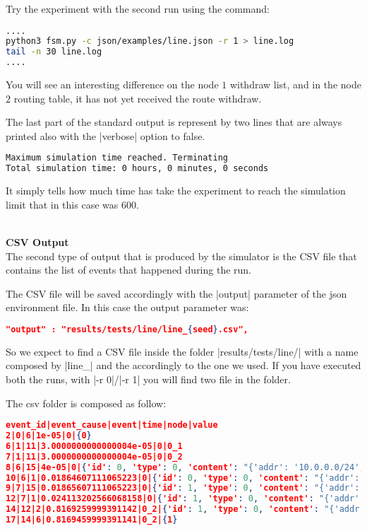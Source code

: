 \documentclass[10pt,journal,onecolumn]{IEEEtran}
\begin{document}
Try the experiment with the second run using the command:

\begin{lstlisting}[language=bash]
....
python3 fsm.py -c json/examples/line.json -r 1 > line.log
tail -n 30 line.log
....
\end{lstlisting}

You will see an interesting difference on the node $1$ withdraw list, and in the
node $2$ routing table, it has not yet received the route withdraw.

The last part of the standard output is represent by two lines that are always
printed also with the |verbose| option to false.

\begin{lstlisting}[language=bash]
Maximum simulation time reached. Terminating
Total simulation time: 0 hours, 0 minutes, 0 seconds
\end{lstlisting}

It simply tells how much time has take the experiment to reach the simulation limit
that in this case was \num{600}.

\\
\textbf{CSV Output}
\\

The second type of output that is produced by the simulator is the CSV file
that contains the list of events that happened during the run.

The CSV file will be saved accordingly with the |output| parameter of the
json environment file.
In this case the output parameter was:

\begin{lstlisting}[language=json]
"output" : "results/tests/line/line_{seed}.csv",
\end{lstlisting}

So we expect to find a CSV file inside the folder |results/tests/line/| with
a name composed by |line_| and the accordingly to the one we used.
If you have executed both the runs, with |-r 0|/|-r 1| you will find two file
in the folder.

The csv folder is composed as follow:
\begin{lstlisting}[language=json]
event_id|event_cause|event|time|node|value
2|0|6|1e-05|0|{0}
6|1|11|3.0000000000000004e-05|0|0_1
7|1|11|3.0000000000000004e-05|0|0_2
8|6|15|4e-05|0|{'id': 0, 'type': 0, 'content': "{'addr': '10.0.0.0/24', 'nh': '0', 'path': ['0'], 'policy_value': '0'}"}
10|6|1|0.01864607111065223|0|{'id': 0, 'type': 0, 'content': "{'addr': '10.0.0.0/24', 'nh': '0', 'path': ['0'], 'policy_value': '0'}"}
9|7|15|0.01865607111065223|0|{'id': 1, 'type': 0, 'content': "{'addr': '10.0.0.0/24', 'nh': '0', 'path': ['0'], 'policy_value': '0'}"}
12|7|1|0.024113202566068158|0|{'id': 1, 'type': 0, 'content': "{'addr': '10.0.0.0/24', 'nh': '0', 'path': ['0'], 'policy_value': '0'}"}
14|12|2|0.8169259999391142|0_2|{'id': 1, 'type': 0, 'content': "{'addr': '10.0.0.0/24', 'nh': '0', 'path': ['0'], 'policy_value': '0'}"}
17|14|6|0.8169459999391141|0_2|{1}
\end{lstlisting}
\end{document}

